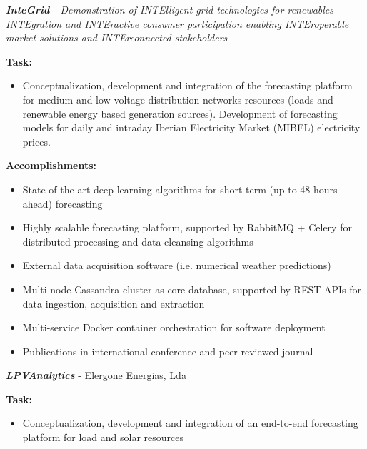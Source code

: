 \documentclass{mycv}
\begin{document}
\begin{myitemize}	
	\item \textit{\textbf{InteGrid} - Demonstration of INTElligent grid technologies for renewables INTEgration and INTEractive consumer participation enabling INTEroperable market solutions and INTErconnected stakeholders}
	
		\vspace{0.15cm}
		\textbf{Task:}
		
		\begin{itemize}[itemsep=1px]
		\item Conceptualization, development and integration of the forecasting platform for medium and low voltage distribution networks resources (loads and renewable energy based generation sources). Development of forecasting models for daily and intraday Iberian Electricity Market (MIBEL) electricity prices.
		\end{itemize}
		
		\textbf{Accomplishments:}
		\begin{itemize}[itemsep=1px]
			\item State-of-the-art deep-learning algorithms for short-term (up to 48 hours ahead) forecasting
			\item Highly scalable forecasting platform, supported by RabbitMQ + Celery for distributed processing and data-cleansing algorithms
			\item External data acquisition software (i.e. numerical weather predictions)
			\item Multi-node Cassandra cluster as core database, supported by REST APIs for data ingestion, acquisition and extraction
			\item Multi-service Docker container orchestration for software deployment
			\item Publications in international conference and peer-reviewed journal
		\end{itemize}
		\vspace{0.2cm}
		
	
	\vspace{0.15cm}	
	
	\item \textit{\textbf{LPVAnalytics}} - Elergone Energias, Lda
	
		\vspace{0.15cm}
		\textbf{Task:}
		
		\begin{itemize}[itemsep=1px]
			\item Conceptualization, development and integration of an end-to-end forecasting platform for load and solar resources
		\end{itemize}
		

\end{myitemize}
\end{document}
